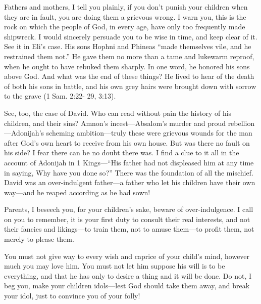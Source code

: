 \documentclass[
]{book}
\begin{document}
Fathers and mothers, I tell you plainly, if you don't punish your children when they are in fault, you are doing them a grievous wrong. I warn you, this is the rock on which the people of God, in every age, have only too frequently made shipwreck. I would sincerely persuade you to be wise in time, and keep clear of it. See it in Eli's case. His sons Hophni and Phineas ``made themselves vile, and he restrained them not.'' He gave them no more than a tame and lukewarm reproof, when he ought to have rebuked them sharply. In one word, he honored his sons above God. And what was the end of these things? He lived to hear of the death of both his sons in battle, and his own grey hairs were brought down with sorrow to the grave (1 Sam. 2:22- 29, 3:13).

See, too, the case of David. Who can read without pain the history of his children, and their sins? Amnon's incest---Absalom's murder and proud rebellion---Adonijah's scheming ambition---truly these were grievous wounds for the man after God's own heart to receive from his own house. But was there no fault on his side? I fear there can be no doubt there was. I find a clue to it all in the account of Adonijah in 1 Kings---``His father had not displeased him at any time in saying, Why have you done so?'' There was the foundation of all the mischief. David was an over-indulgent father---a father who let his children have their own way---and he reaped according as he had sown!

Parents, I beseech you, for your children's sake, beware of over-indulgence. I call on you to remember, it is your first duty to consult their real interests, and not their fancies and likings---to train them, not to amuse them---to profit them, not merely to please them.

You must not give way to every wish and caprice of your child's mind, however much you may love him. You must not let him suppose his will is to be everything, and that he has only to desire a thing and it will be done. Do not, I beg you, make your children idols---lest God should take them away, and break your idol, just to convince you of your folly!
\end{document}

